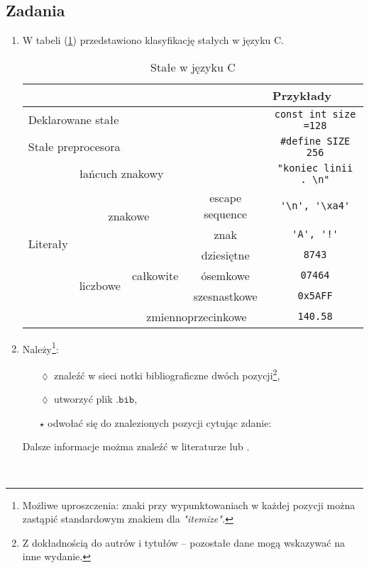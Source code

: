 \documentclass[a4paper, 11pt]{article}
\begin{document}
\subsection{Zadania}
\begin{enumerate}
\item {W tabeli (\ref{tab}) przedstawiono klasyfikację stałych w języku C.

\begin{table}[!h]
\caption{Stałe w języku C}
\label{tab}
\begin{center}
\begin{tabular}{|c|c|c|c|c|}

\cline{5-5}
\multicolumn{4}{l|}{}&\multicolumn{1}{l|}{Przykłady} \\
\hline
\multicolumn{4}{|l|}{Deklarowane stałe} & \verb!const int size =128! \\
\hline
\multicolumn{4}{|l|}{Stałe preprocesora} & \verb!#define SIZE 256! \\
\hline
\multirow{7}{*}{Literały} & \multicolumn{3}{|l|}{łańcuch znakowy} & \verb!"koniec linii . \n"! \\
\cline{2-5}& \multicolumn{2}{c|}{\multirow{2}{*}{znakowe}} & escape sequence & \verb!'\n', '\xa4'!\\
\cline{4-5} &\multicolumn{2}{|l|}{}&znak & \verb|'A', '!'|\\  
\cline{2-5}&\multirow{4}{*}{liczbowe}&\multirow{3}{*}{całkowite}& dziesiętne & \verb!8743! \\
\cline{4-5}&&&ósemkowe&\verb!07464! \\
\cline{4-5}&&&szesnastkowe&\verb!0x5AFF! \\
\cline{3-5}&&\multicolumn{2}{|c|}{zmiennoprzecinkowe}& \verb!140.58!\\

\hline
\end{tabular}
\end{center}
\end{table}

}
\item {Należy\footnote{Możliwe uproszczenia: znaki przy wypunktowaniach w każdej pozycji można zastąpić standardowym znakiem dla {\em"itemize".}}:

\begin{itemize}
\item[$\lozenge$]{znaleźć w sieci notki bibliograficzne dwóch pozycji\footnote{Z dokładnością do autrów i tytułów -- pozostałe dane mogą wskazywać na inne wydanie.},
}
\item[$\lozenge$]{utworzyć plik $\mathtt{.bib}$,}
\item[$\star$]{odwołać się do znalezionych pozycji cytując zdanie:
}
\end{itemize}
{\centering Dalsze informacje możma znaleźć w literaturze \cite{kahneman2011thinking} lub \cite{kernighan2006c}.}
}
\end{enumerate}
\

\end{document}
